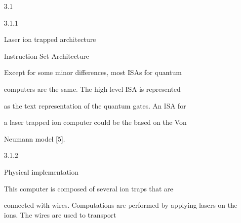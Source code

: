 \documentclass[a4paper,portrait,12pt]{article}
\begin{document}
3.1


3.1.1





\begin{flushleft}
Laser ion trapped architecture
\end{flushleft}


\begin{flushleft}
Instruction Set Architecture
\end{flushleft}





\begin{flushleft}
Except for some minor differences, most ISAs for quantum
\end{flushleft}


\begin{flushleft}
computers are the same. The high level ISA is represented
\end{flushleft}


\begin{flushleft}
as the text representation of the quantum gates. An ISA for
\end{flushleft}


\begin{flushleft}
a laser trapped ion computer could be the based on the Von
\end{flushleft}


\begin{flushleft}
Neumann model [5].
\end{flushleft}





3.1.2





\begin{flushleft}
Physical implementation
\end{flushleft}





\begin{flushleft}
This computer is composed of several ion traps that are
\end{flushleft}


\begin{flushleft}
connected with wires. Computations are performed by applying lasers on the ions. The wires are used to transport
\end{flushleft}
\end{document}
